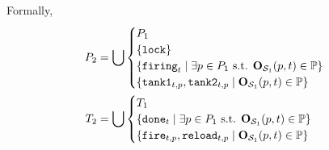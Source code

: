 Formally,
\begin{align*}
  \places_2 &= \bigcup \begin{cases}
      \places_1 \\
      \{ \mathtt{lock} \} \\
      \setComp{\mathtt{firing}_t}{\exists p \in \places_1 \text{ s.t. } \outm[\namePPN[1]][p,t] \in \parameters} \\
      \setComp{\mathtt{tank1}_{t,p}, \mathtt{tank2}_{t,p}}{\outm[\namePPN[1]][p,t] \in \parameters}
    \end{cases}\\
  \transitions_2 &= \bigcup \begin{cases}
      \transitions_1 \\
      \setComp{\mathtt{done}_t}{\exists p \in \places_1 \text{ s.t. } \outm[\namePPN[1]][p,t] \in \parameters} \\
      \setComp{\mathtt{fire}_{t,p}, \mathtt{reload}_{t,p}}{\outm[\namePPN[1]][p,t] \in \parameters}
    \end{cases}
\end{align*}
